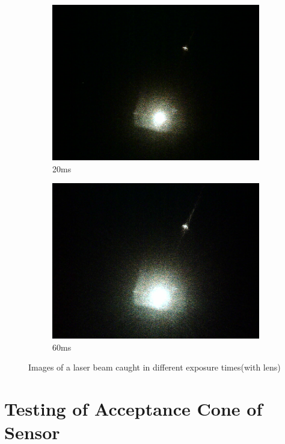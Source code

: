 \begin{figure}[ht]
        \begin{subfigure}{0.5\textwidth}
    \centering
        \includegraphics[width=0.5\linewidth]{pics/exposure/20ms}
        \caption{20ms}
        \label{fig:exp20ms}
    \end{subfigure}%
    \begin{subfigure}{0.5\textwidth}
    \centering
        \includegraphics[width=0.5\linewidth]{pics/exposure/60ms}
        \caption{60ms}
        \label{fig:exp60ms}
        
    \end{subfigure}    
    \caption{Images of a laser beam caught in different exposure times(with lens)}
    \label{fig:exptests}
    \end{figure}

\section{Testing of Acceptance Cone of Sensor}
